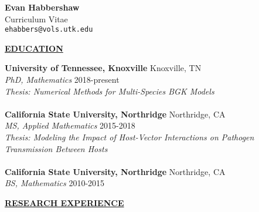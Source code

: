 \documentclass{article}
\begin{document}
\thispagestyle{firstpage}
\begin{center}
    \huge \textbf{Evan Habbershaw\\}
    \normalsize Curriculum Vitae \\ \texttt{ehabbers@vols.utk.edu}%
    \\
    \hrulefill
\end{center}


\begin{center}
    \textbf{\underline{EDUCATION}}
\end{center}

\noindent \textbf{University of Tennessee, Knoxville}
  \hfill Knoxville, TN
\\
\textit{PhD, Mathematics}
  \hfill 2018-present
\\
\textit{Thesis: Numerical Methods for Multi-Species BGK Models}
\\
\\
\textbf{California State University, Northridge}
  \hfill Northridge, CA
\\
\textit{MS, Applied Mathematics}
  \hfill 2015-2018
\\
\textit{Thesis: Modeling the Impact of Host-Vector Interactions on Pathogen Transmission Between Hosts}
\\
\\
\textbf{California State University, Northridge}
  \hfill Northridge, CA
\\
\textit{BS, Mathematics}
  \hfill 2010-2015

  
\begin{center}
    \textbf{\underline{RESEARCH EXPERIENCE}}
\end{center}
\end{document}
